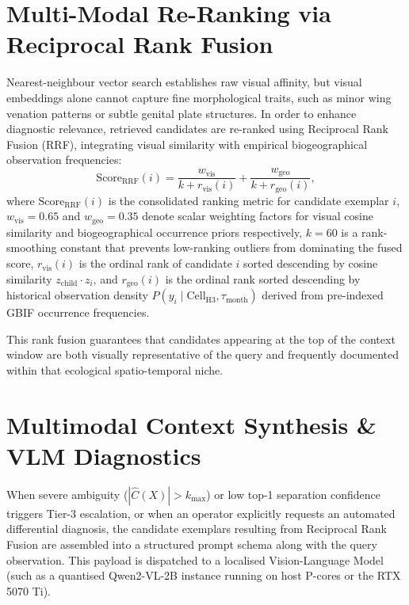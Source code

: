 \section{Multi-Modal Re-Ranking via Reciprocal Rank Fusion}
\label{sec:rrf_reranking}

Nearest-neighbour vector search establishes raw visual affinity, but visual embeddings alone cannot capture fine morphological traits, such as minor wing venation patterns or subtle genital plate structures. In order to enhance diagnostic relevance, retrieved candidates are re-ranked using Reciprocal Rank Fusion (RRF), integrating visual similarity with empirical biogeographical observation frequencies:
\[
\text{Score}_{\text{RRF}}(i) = \frac{w_{\text{vis}}}{k + r_{\text{vis}}(i)} + \frac{w_{\text{geo}}}{k + r_{\text{geo}}(i)},
\]
where $\text{Score}_{\text{RRF}}(i)$ is the consolidated ranking metric for candidate exemplar $i$, $w_{\text{vis}} = 0.65$ and $w_{\text{geo}} = 0.35$ denote scalar weighting factors for visual cosine similarity and biogeographical occurrence priors respectively, $k = 60$ is a rank-smoothing constant that prevents low-ranking outliers from dominating the fused score, $r_{\text{vis}}(i)$ is the ordinal rank of candidate $i$ sorted descending by cosine similarity $z_{\text{child}} \cdot z_{i}$, and $r_{\text{geo}}(i)$ is the ordinal rank sorted descending by historical observation density $P(y_i \mid \text{Cell}_{\text{H3}}, \tau_{\text{month}})$ derived from pre-indexed GBIF occurrence frequencies.

This rank fusion guarantees that candidates appearing at the top of the context window are both visually representative of the query and frequently documented within that ecological spatio-temporal niche.

\section{Multimodal Context Synthesis \& VLM Diagnostics}
\label{sec:vlm_synthesis}

When severe ambiguity ($|\hat{C}(X)| > k_{\max}$) or low top-1 separation confidence triggers Tier-3 escalation, or when an operator explicitly requests an automated differential diagnosis, the candidate exemplars resulting from Reciprocal Rank Fusion are assembled into a structured prompt schema along with the query observation. This payload is dispatched to a localised Vision-Language Model (such as a quantised Qwen2-VL-2B instance running on host P-cores or the RTX 5070 Ti).

